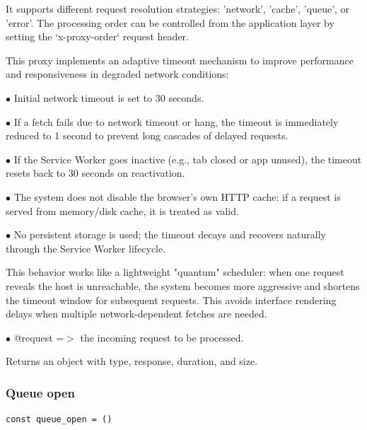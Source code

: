 \documentclass[a4paper]{article}
\begin{document}
It supports different request resolution strategies: 'network', 'cache',
'queue', or 'error'. The processing order can be controlled from the
application layer by setting the `x-proxy-order` request header.

This proxy implements an adaptive timeout mechanism to improve performance
and responsiveness in degraded network conditions:

\begin{compactitem}
\item[\color{myblue}$\bullet$] Initial network timeout is set to 30 seconds.
\item[\color{myblue}$\bullet$] If a fetch fails due to network timeout or hang, the timeout is immediately
  reduced to 1 second to prevent long cascades of delayed requests.
\item[\color{myblue}$\bullet$] If the Service Worker goes inactive (e.g., tab closed or app unused),
  the timeout resets back to 30 seconds on reactivation.
\item[\color{myblue}$\bullet$] The system does not disable the browser’s own HTTP cache:
  if a request is served from memory/disk cache, it is treated as valid.
\item[\color{myblue}$\bullet$] No persistent storage is used; the timeout decays and recovers naturally
  through the Service Worker lifecycle.
\end{compactitem}

This behavior works like a lightweight "quantum" scheduler: when one request
reveals the host is unreachable, the system becomes more aggressive and shortens
the timeout window for subsequent requests. This avoids interface rendering delays
when multiple network-dependent fetches are needed.

\begin{compactitem}
\item[\color{myblue}$\bullet$] @request =$>$ the incoming request to be processed.
\end{compactitem}

Returns an object with type, response, duration, and size.

\hypertarget{toc267}{}
\subsubsection{Queue open}

\begin{lstlisting}
const queue_open = ()
\end{lstlisting}
\end{document}

